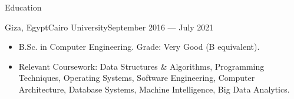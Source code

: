 \documentclass[]{mcdowellcv}
\begin{document}
	\makeheader
	
	
	\begin{cvsection}{Education}
		\begin{cvsubsection}{Giza, Egypt}{Cairo University}{September 2016 — July 2021}
			\begin{itemize}
				\item B.Sc. in Computer Engineering. Grade: Very Good (B equivalent).
				\item Relevant Coursework: Data Structures \& Algorithms, Programming Techniques, Operating Systems, Software Engineering, Computer Architecture, Database Systems, Machine Intelligence, Big Data Analytics.
			\end{itemize}
		\end{cvsubsection}
	\end{cvsection}
	
\end{document}
